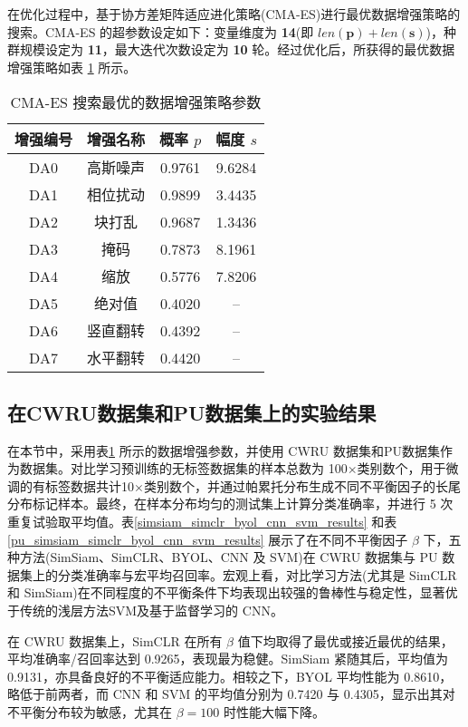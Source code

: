 \documentclass[master]{thesis-uestc}
\begin{document}
在优化过程中，基于协方差矩阵适应进化策略(CMA-ES)进行最优数据增强策略的搜索。CMA-ES 的超参数设定如下：变量维度为 \textbf{14}(即 \(len(\mathbf{p}) + len(\mathbf{s})\))，种群规模设定为 \textbf{11}，最大迭代次数设定为 \textbf{10} 轮。经过优化后，所获得的最优数据增强策略如表 \ref{CMA-ES_solution} 所示。

\begin{table}[h]
    \caption{CMA-ES 搜索最优的数据增强策略参数}
    \centering
    \begin{tabular}{cccc}
    \toprule
    增强编号 & 增强名称 & 概率 $p$ & 幅度 $s$\\
    \midrule
    DA0 & 高斯噪声 & 0.9761 & 9.6284 \\
    DA1 & 相位扰动 & 0.9899 & 3.4435 \\
    DA2 & 块打乱 & 0.9687 & 1.3436 \\
    DA3 & 掩码 & 0.7873 & 8.1961 \\
    DA4 & 缩放 & 0.5776 & 7.8206 \\
    DA5 & 绝对值 & 0.4020 & -- \\
    DA6 & 竖直翻转 & 0.4392 & -- \\
    DA7 & 水平翻转 & 0.4420 & -- \\
    \bottomrule
    \end{tabular}
    \label{CMA-ES_solution}
\end{table}
\FloatBarrier  %
\subsection{在CWRU数据集和PU数据集上的实验结果}
\label{simsiam_cwru_results}
在本节中，采用表\ref{CMA-ES_solution} 所示的数据增强参数，并使用 CWRU 数据集和PU数据集作为数据集。对比学习预训练的无标签数据集的样本总数为 100$\times$类别数个，用于微调的有标签数据共计10$\times$类别数个，并通过帕累托分布生成不同不平衡因子的长尾分布标记样本。最终，在样本分布均匀的测试集上计算分类准确率，并进行 5 次重复试验取平均值。表\ref{simsiam_simclr_byol_cnn_svm_results} 和表\ref{pu_simsiam_simclr_byol_cnn_svm_results} 展示了在不同不平衡因子 $\beta$ 下，五种方法(SimSiam、SimCLR、BYOL、CNN 及 SVM)在 CWRU 数据集与 PU 数据集上的分类准确率与宏平均召回率。宏观上看，对比学习方法(尤其是 SimCLR 和 SimSiam)在不同程度的不平衡条件下均表现出较强的鲁棒性与稳定性，显著优于传统的浅层方法SVM及基于监督学习的 CNN。

在 CWRU 数据集上，SimCLR 在所有 $\beta$ 值下均取得了最优或接近最优的结果，平均准确率/召回率达到 0.9265，表现最为稳健。SimSiam 紧随其后，平均值为 0.9131，亦具备良好的不平衡适应能力。相较之下，BYOL 平均性能为 0.8610，略低于前两者，而 CNN 和 SVM 的平均值分别为 0.7420 与 0.4305，显示出其对不平衡分布较为敏感，尤其在 $\beta = 100$ 时性能大幅下降。
\end{document}
